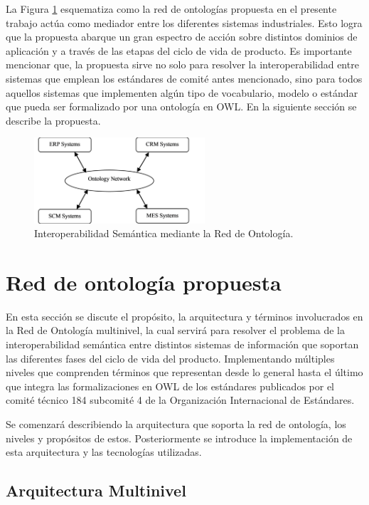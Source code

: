 \documentclass[journal]{IEEEtran}
\begin{document}
La Figura \ref{fig1} esquematiza como la red de ontolog\'ias propuesta en el presente trabajo act\'ua como mediador entre los diferentes sistemas industriales. Esto logra que la propuesta abarque un gran espectro de acci\'on sobre distintos dominios de aplicaci\'on y a trav\'es de las etapas del ciclo de vida de producto. Es importante mencionar que, la propuesta sirve no solo para resolver la interoperabilidad entre sistemas que emplean los est\'andares de comit\'e antes mencionado, sino para todos aquellos sistemas que implementen alg\'un tipo de vocabulario, modelo o est\'andar que pueda ser formalizado por una ontolog\'ia en OWL. En la siguiente secci\'on se describe la propuesta.

\begin{figure}[!t]
\centering
\includegraphics[width=2.5in]{figures/figure1.png}
\caption{Interoperabilidad Sem\'antica mediante la Red de Ontolog\'ia.}
\label{fig1}
\end{figure}

\section{Red de ontolog\'ia propuesta}

En esta secci\'on se discute el prop\'osito, la arquitectura y t\'erminos involucrados en la Red de Ontolog\'ia multinivel, la cual servir\'a para resolver el problema de la interoperabilidad sem\'antica entre distintos sistemas de informaci\'on que soportan las diferentes fases del ciclo de vida del producto. Implementando m\'ultiples niveles que comprenden t\'erminos que representan desde lo general hasta el \'ultimo que integra las formalizaciones en OWL de los est\'andares publicados por el comit\'e t\'ecnico 184 subcomit\'e 4 de la Organizaci\'on Internacional de Est\'andares. 

Se comenzar\'a describiendo la arquitectura que soporta la red de ontolog\'ia, los niveles y prop\'ositos de estos. Posteriormente se introduce la implementaci\'on de esta arquitectura y las tecnolog\'ias utilizadas.

\subsection{Arquitectura Multinivel}
\end{document}
